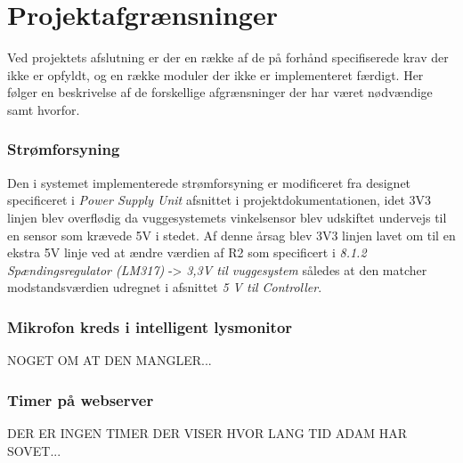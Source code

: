 %
\chapter{Projektafgrænsninger}
\label{projektafgraensninger}
Ved projektets afslutning er der en række af de på forhånd specifiserede krav der ikke er opfyldt, og en række moduler der ikke er implementeret færdigt. Her følger en beskrivelse af de forskellige afgrænsninger der har været nødvændige samt hvorfor. 

\subsection{Strømforsyning}
Den i systemet implementerede strømforsyning er modificeret fra designet specificeret i \textit{Power Supply Unit} afsnittet i projektdokumentationen, idet 3V3 linjen blev overflødig da vuggesystemets vinkelsensor blev udskiftet undervejs til en sensor som krævede 5V i stedet. Af denne årsag blev 3V3 linjen lavet om til en ekstra 5V linje ved at ændre værdien af R2 som specificert i \textit{8.1.2 Spændingsregulator (LM317)} -> \textit{3,3V til vuggesystem} således at den matcher modstandsværdien udregnet i afsnittet \textit{5 V til Controller}.

\subsection{Mikrofon kreds i intelligent lysmonitor}
NOGET OM AT DEN MANGLER...

\subsection{Timer på webserver}
DER ER INGEN TIMER DER VISER HVOR LANG TID ADAM HAR SOVET...

